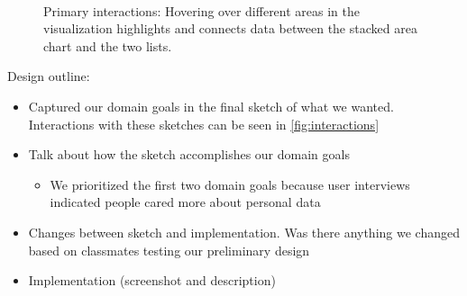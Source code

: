 \documentclass[journal]{vgtc}                %
\begin{document}
\begin{figure}
\centering
\mbox{
  \quad
  \quad
}
\caption{Primary interactions: Hovering over different areas in the visualization highlights and connects data between the stacked area chart and the two lists.}
\label{fig:interactions}
\end{figure}

Design outline:
\begin{itemize}
  \item Captured our domain goals in the final sketch of what we wanted. Interactions with these sketches can be seen in \autoref{fig:interactions}
  \item Talk about how the sketch accomplishes our domain goals
  \begin{itemize}
    \item We prioritized the first two domain goals because user interviews indicated people cared more about personal data
  \end{itemize}
  \item Changes between sketch and implementation. Was there anything we changed based on classmates testing our preliminary design
  \item Implementation (screenshot and description)
\end{itemize}
\end{document}
